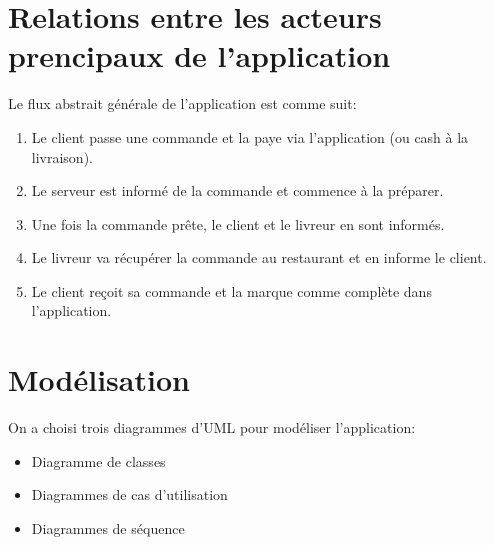 \documentclass[french, a4paper, 12pt]{report}
\begin{document}
	\section{Relations entre les acteurs prencipaux de l'application} Le flux abstrait générale de l'application est comme suit:
	\begin{enumerate}
		\item Le client passe une commande et la paye via l'application (ou cash à la livraison).
	\item Le serveur est informé de la commande et commence à la préparer.
	\item Une fois la commande prête, le client et le livreur en sont informés.
	\item Le livreur va récupérer la commande au restaurant et en informe le client.
	\item Le client reçoit sa commande et la marque comme complète dans l'application.
	\end{enumerate}
	
	
	\section{Modélisation} On a choisi trois diagrammes d’UML pour modéliser l'application:
		\begin{itemize}
			\item Diagramme de classes
			\item Diagrammes de cas d’utilisation
			\item Diagrammes de séquence
		\end{itemize}
		
		\newpage
\end{document}
